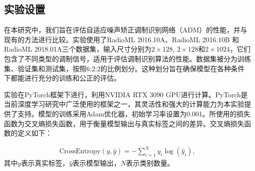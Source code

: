 \subsection{实验设置}

在本研究中，我们旨在评估自适应噪声矫正调制识别网络（ADM）的性能，并与现有的方法进行比较。实验使用了RadioML 2016.10A、RadioML 2016.10B 和 RadioML 2018.01A三个数据集，输入尺寸分别为$2 \times 128$, $2 \times 128$和$2 \times 1024$，它们包含了不同类型的调制信号，适用于评估调制识别算法的性能。数据集被分为训练集、验证集和测试集，按照6:2:2的比例划分。这种划分旨在确保模型在各种条件下都能进行充分的训练和公正的评估。

实验在PyTorch框架下进行，利用NVIDIA RTX 3090 GPU进行计算。PyTorch是当前深度学习研究中广泛使用的框架之一，其灵活性和强大的计算能力为本实验提供了支持。模型的训练采用Adam优化器，初始学习率设置为0.001。所使用的损失函数为交叉熵损失函数，用于衡量模型输出与真实标签之间的差异。交叉熵损失函数的定义如下：

\begin{equation}
\begin{aligned}
\text{CrossEntropy}(y, \hat{y}) = -\sum_{i=1}^{N} y_i \log(\hat{y}_i),
\end{aligned}
\label{equ: crossentropy}
\end{equation}
其中$y$表示真实标签，$\hat{y}$表示模型输出，$N$表示类别数量。

